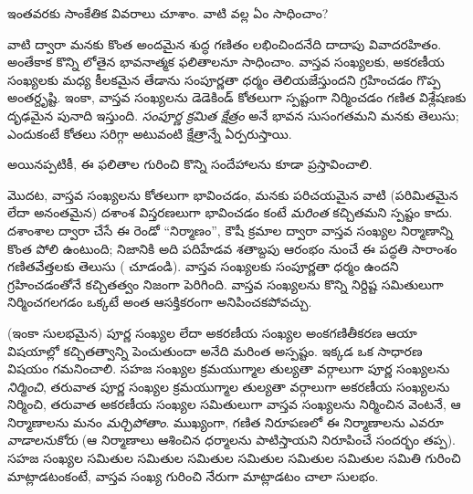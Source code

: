 \documentclass[../../../include/open-logic-section]{subfiles}
\begin{document}

ఇంతవరకు సాంకేతిక వివరాలు చూశాం. వాటి వల్ల ఏం సాధించాం?

వాటి ద్వారా మనకు కొంత {అందమైన} శుద్ధ గణితం లభించిందనేది దాదాపు
వివాదరహితం. అంతేకాక కొన్ని లోతైన భావనాత్మక ఫలితాలనూ సాధించాం. వాస్తవ
సంఖ్యలకు, అకరణీయ సంఖ్యలకు మధ్య కీలకమైన తేడాను సంపూర్ణతా ధర్మం
తెలియజేస్తుందని గ్రహించడం గొప్ప అంతర్దృష్టి. ఇంకా, వాస్తవ సంఖ్యలను
డెడెకిండ్ కోతలుగా స్పష్టంగా నిర్మించడం గణిత విశ్లేషణకు దృఢమైన
పునాది ఇస్తుంది. \emph{సంపూర్ణ క్రమిత క్షేత్రం} అనే భావన సుసంగతమని
మనకు తెలుసు; ఎందుకంటే కోతలు సరిగ్గా అటువంటి క్షేత్రాన్నే ఏర్పరుస్తాయి.

అయినప్పటికీ, ఈ ఫలితాల గురించి కొన్ని సందేహాలను కూడా ప్రస్తావించాలి.

మొదట, వాస్తవ సంఖ్యలను కోతలుగా భావించడం, మనకు పరిచయమైన వాటి (పరిమితమైన లేదా
అనంతమైన) దశాంశ విస్తరణలుగా భావించడం కంటే \emph{మరింత} కచ్చితమని
స్పష్టం కాదు. దశాంశాల ద్వారా చేసే ఈ రెండో ``నిర్మాణం'', కౌషీ క్రమాల
ద్వారా వాస్తవ సంఖ్యల నిర్మాణాన్ని కొంత పోలి ఉంటుంది; నిజానికి అది
పదిహేడవ శతాబ్దపు ఆరంభం నుంచే ఈ పద్ధతి సారాంశం గణితవేత్తలకు తెలుసు
( చూడండి). వాస్తవ సంఖ్యలకు సంపూర్ణతా ధర్మం ఉందని
గ్రహించడంతోనే కచ్చితత్వం నిజంగా పెరిగింది. వాస్తవ సంఖ్యలను కొన్ని
నిర్దిష్ట సమితులుగా నిర్మించగలగడం ఒక్కటే అంత ఆసక్తికరంగా అనిపించకపోవచ్చు.

(ఇంకా సులభమైన) పూర్ణ సంఖ్యల లేదా అకరణీయ సంఖ్యల అంకగణితీకరణ ఆయా
విషయాల్లో కచ్చితత్వాన్ని పెంచుతుందా అనేది మరింత అస్పష్టం. ఇక్కడ ఒక
సాధారణ విషయం గమనించాలి. సహజ సంఖ్యల క్రమయుగ్మాల తుల్యతా వర్గాలుగా
పూర్ణ సంఖ్యలను \emph{నిర్మించి}, తరువాత పూర్ణ సంఖ్యల క్రమయుగ్మాల
తుల్యతా వర్గాలుగా అకరణీయ సంఖ్యలను నిర్మించి, తరువాత అకరణీయ సంఖ్యల
సమితులుగా వాస్తవ సంఖ్యలను నిర్మించిన వెంటనే, ఆ నిర్మాణాలను మనం
\emph{మర్చిపోతాం}. ముఖ్యంగా, గణిత నిరూపణలో ఈ నిర్మాణాలను ఎవరూ
\emph{వాడాలనుకోరు} (ఆ నిర్మాణాలు ఆశించిన ధర్మాలను పాటిస్తాయని
నిరూపించే సందర్భం తప్ప). సహజ సంఖ్యల సమితుల సమితుల సమితుల సమితుల
సమితుల సమితుల సమితి గురించి మాట్లాడటంకంటే, వాస్తవ సంఖ్య గురించి
నేరుగా మాట్లాడటం చాలా సులభం.
%
%
%
\end{document}
